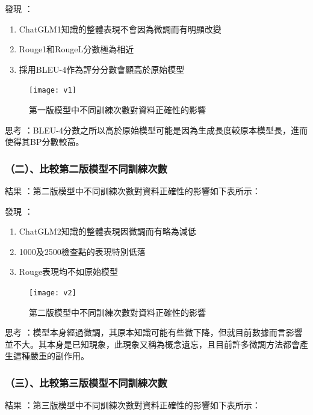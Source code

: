 \documentclass[8pt,a4paper,MingLiU,UTF8]{article}
\def\xeCJKembold{0.4}
\def\saveCJKnode{\dimen255\lastkern}
\def\restoreCJKnode{\kern-\dimen255\kern\dimen255}
\let\CJKoldsymbol\CJKsymbol
\let\CJKoldpunctsymbol\CJKpunctsymbol
\def\CJKfakeboldsymbol#1{%
	\special{pdf:literal direct 2 Tr \xeCJKembold\space w}%
	\CJKoldsymbol{#1}%
	\saveCJKnode
	\special{pdf:literal direct 0 Tr}%
	\restoreCJKnode}
\def\CJKfakeboldpunctsymbol#1{%
	\special{pdf:literal direct 2 Tr \xeCJKembold\space w}%
	\CJKoldpunctsymbol{#1}%
	\saveCJKnode
	\special{pdf:literal direct 0 Tr}%
	\restoreCJKnode}
\newcommand\CJKfakebold[1]{%
	\let\CJKsymbol\CJKfakeboldsymbol
	\let\CJKpunctsymbol\CJKfakeboldpunctsymbol
	#1%
	\let\CJKsymbol\CJKoldsymbol
	\let\CJKpunctsymbol\CJKoldpunctsymbol}
\begin{document}
	\CJKfakebold{發現}：
	
	

	\begin{enumerate}
		\item ChatGLM1知識的整體表現不會因為微調而有明顯改變
		\item Rouge1和RougeL分數極為相近
		\item 採用BLEU-4作為評分分數會顯高於原始模型
	\end{enumerate}

\begin{figure}
	\centering
	\texttt{[image: v1]}
	\caption{第一版模型中不同訓練次數對資料正確性的影響}
\end{figure}

	\CJKfakebold{思考}：BLEU-4分數之所以高於原始模型可能是因為生成長度較原本模型長，進而使得其BP分數較高。
	
	\subsubsection{（二）、比較第二版模型不同訓練次數}
	\CJKfakebold{結果}：第二版模型中不同訓練次數對資料正確性的影響如下表所示：
	
	\CJKfakebold{發現}：
	
	

	\begin{enumerate}
		\item ChatGLM2知識的整體表現因微調而有略為減低
		\item 1000及2500檢查點的表現特別低落
		\item Rouge表現均不如原始模型
	\end{enumerate}

\begin{figure}
	\centering
	\texttt{[image: v2]}
	\caption{第二版模型中不同訓練次數對資料正確性的影響}
\end{figure}

	\CJKfakebold{思考}：模型本身經過微調，其原本知識可能有些微下降，但就目前數據而言影響並不大。其本身是已知現象，此現象又稱為概念遺忘，且目前許多微調方法都會產生這種嚴重的副作用。\cite{mukhoti2023finetuning}
	
	\subsubsection{（三）、比較第三版模型不同訓練次數}
	\CJKfakebold{結果}：第三版模型中不同訓練次數對資料正確性的影響如下表所示：
	
\end{document}
